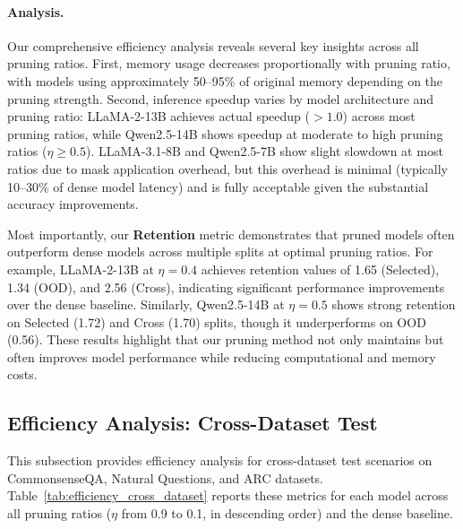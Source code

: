 \paragraph{Analysis.}
Our comprehensive efficiency analysis reveals several key insights across all pruning ratios.
First, memory usage decreases proportionally with pruning ratio, with models using approximately 50--95\% of original memory depending on the pruning strength.
Second, inference speedup varies by model architecture and pruning ratio: LLaMA-2-13B achieves actual speedup ($>1.0$) across most pruning ratios, while Qwen2.5-14B shows speedup at moderate to high pruning ratios ($\eta \geq 0.5$).
LLaMA-3.1-8B and Qwen2.5-7B show slight slowdown at most ratios due to mask application overhead, but this overhead is minimal (typically 10--30\% of dense model latency) and is fully acceptable given the substantial accuracy improvements.

Most importantly, our \textbf{Retention} metric demonstrates that pruned models often outperform dense models across multiple splits at optimal pruning ratios.
For example, LLaMA-2-13B at $\eta=0.4$ achieves retention values of 1.65 (Selected), 1.34 (OOD), and 2.56 (Cross), indicating significant performance improvements over the dense baseline.
Similarly, Qwen2.5-14B at $\eta=0.5$ shows strong retention on Selected (1.72) and Cross (1.70) splits, though it underperforms on OOD (0.56).
These results highlight that our pruning method not only maintains but often improves model performance while reducing computational and memory costs.

\subsection{Efficiency Analysis: Cross-Dataset Test}
\label{app:efficiency_cross_dataset}

This subsection provides efficiency analysis for cross-dataset test scenarios on CommonsenseQA, Natural Questions, and ARC datasets.
Table~\ref{tab:efficiency_cross_dataset} reports these metrics for each model across all pruning ratios ($\eta$ from 0.9 to 0.1, in descending order) and the dense baseline.


